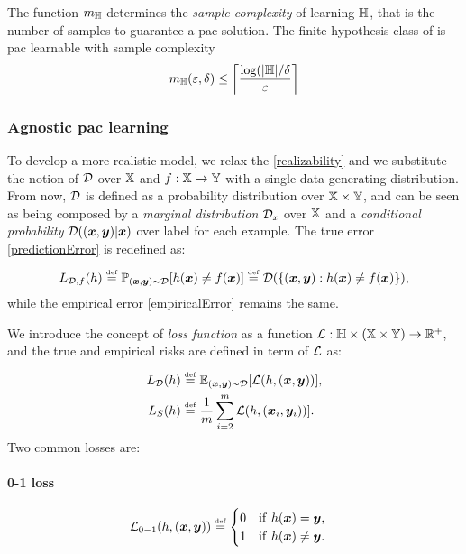 The function $m_{\mathbb{H}}$ determines the \emph{sample complexity} of
learning $\mathbb{H}$, that is the number of samples to guarantee a
\ac{pac} solution. The finite hypothesis class of
is \ac{pac} learnable with sample complexity
\begin{equation*}
  m_{\mathbb{H}}(\varepsilon,\delta)\leq\left\lceil\frac{\log(|\mathbb{H}|/\delta}{\varepsilon}\right\rceil
\end{equation*}

\subsubsection{Agnostic \ac{pac} learning}
To develop a more realistic model, we relax the \cref{realizability}
and we substitute the notion of $\mathcal{D}$ over $\mathbb{X}$ and
$f:\mathbb{X}\rightarrow\mathbb{Y}$ with a single data generating
distribution. From now, $\mathcal{D}$ is defined as a probability
distribution over $\mathbb{X}\times\mathbb{Y}$, and can be seen as being
composed by a \emph{marginal distribution} $\mathcal{D}_x$ over $\mathbb{X}$
and a \emph{conditional probability} $\mathcal{D}((\bm{x},\bm{y})|\bm{x})$ over label
for each example. The true error \cref{predictionError} is redefined as:
\begin{equation*}
  L_{\mathcal{D},f}(h)\overset{\underset{\mathrm{def}}{}}{=}\mathbb{P}_{(\bm{x},\bm{y})\sim\mathcal{D}}[h(\bm{x})\neq
  f(\bm{x})]\overset{\underset{\mathrm{def}}{}}{=}\mathcal{D}(\{(\bm{x},\bm{y}):h(\bm{x})\neq
  f(\bm{x})\}),  
\end{equation*}
while the empirical error \cref{empiricalError} remains the same.

We introduce the concept of \emph{loss function} as a function
$\mathcal{L}:\mathbb{H}\times(\mathbb{X}\times\mathbb{Y})\rightarrow\mathbb{R}^+$, and the true
and empirical risks are defined in term of $\mathcal{L}$ as:
\begin{align*}
  L_{\mathcal{D}}(h)&\overset{\underset{\mathrm{def}}{}}{=}\mathbb{E}_{(\bm{x},\bm{y})\sim\mathcal{D}}[\mathcal{L}(h,(\bm{x},\bm{y}))],\\
  L_S(h)&\overset{\underset{\mathrm{def}}{}}{=}\frac{1}{m}\sum_{i=2}^m\mathcal{L}(h,(\bm{x}_i,\bm{y}_i))].
\end{align*}
Two common losses are:
\paragraph{0-1 loss}
\begin{equation*}
  \mathcal{L}_{0-1}(h,(\bm{x},\bm{y}))\overset{\underset{\mathrm{def}}{}}{=}\begin{cases}
    0\quad\mathrm{if}\ h(\bm{x}) = \bm{y},\\
    1\quad\mathrm{if}\ h(\bm{x}) \neq \bm{y}.
  \end{cases}
\end{equation*}
